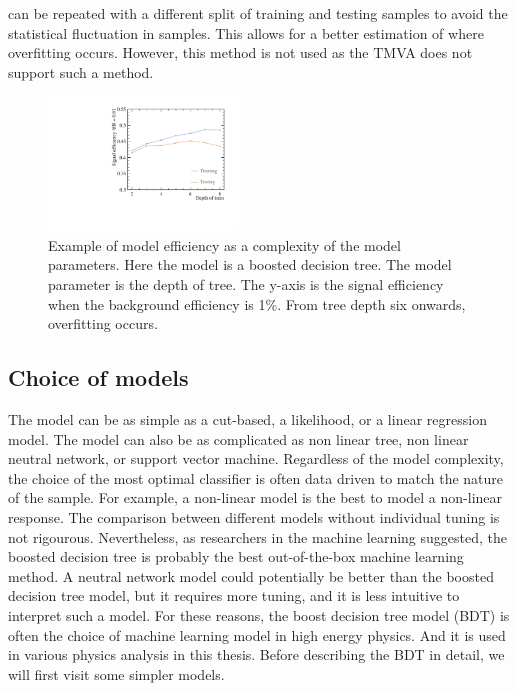   can be repeated with a different split of training and testing samples to avoid the statistical fluctuation in samples. This allows for a better estimation of where overfitting occurs. However, this method is not used as the TMVA does not support such a method.


\begin{figure}[!tbp]
\includegraphics[width=0.45\textwidth]{doubleHiggs/DepthOfTrees.pdf}
\caption{Example of model efficiency as a complexity of the model parameters. Here the model is a boosted decision tree. The model parameter is the depth of tree. The y-axis is the signal efficiency when the background efficiency is 1\%. From tree depth six onwards, overfitting occurs.}
\label{fig:doubleHiggsMVAovertraining}
\end{figure}


\subsection{Choice of models}

The model can be as simple as a cut-based, a likelihood, or a linear regression model. The model can also be as complicated as non linear tree, non linear neutral network, or support vector machine. Regardless of the model complexity, the choice of the most optimal classifier is often data driven to match the nature of the sample. For example, a non-linear model is the best to model a non-linear response. The  comparison between different models without individual tuning is not rigourous.  Nevertheless, as researchers in the machine learning suggested, the boosted decision tree is probably the best out-of-the-box machine learning method. A neutral network model could potentially be better than the boosted decision tree model, but it requires more tuning, and it is less intuitive to interpret such a model. For these reasons, the boost decision tree model (BDT) is often the choice of machine learning model in high energy physics. And it is used in various physics analysis in this thesis. Before describing the BDT in detail, we will first visit some simpler models.

